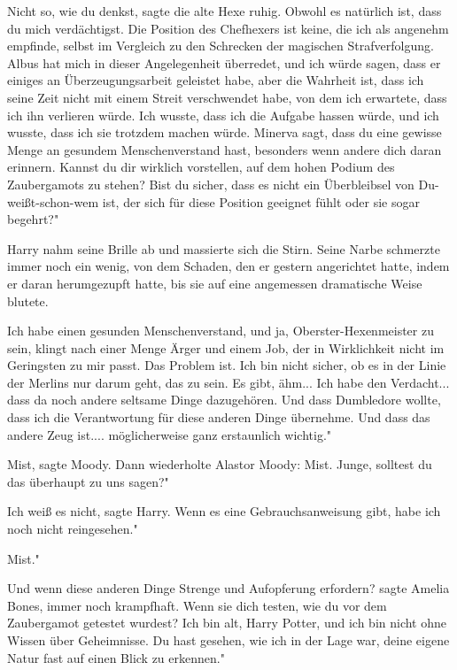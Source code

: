 \glqq Nicht so, wie du denkst\grqq{}, sagte die alte Hexe ruhig. \glqq Obwohl es
natürlich ist, dass du mich verdächtigst. Die Position des Chefhexers ist keine,
die ich als angenehm empfinde, selbst im Vergleich zu den Schrecken der
magischen Strafverfolgung. Albus hat mich in dieser Angelegenheit überredet, und
ich würde sagen, dass er einiges an Überzeugungsarbeit geleistet habe, aber die
Wahrheit ist, dass ich seine Zeit nicht mit einem Streit verschwendet habe, von
dem ich erwartete, dass ich ihn verlieren würde. Ich wusste, dass ich die
Aufgabe hassen würde, und ich wusste, dass ich sie trotzdem machen würde.
Minerva sagt, dass du eine gewisse Menge an gesundem Menschenverstand hast,
besonders wenn andere dich daran erinnern. Kannst du dir wirklich vorstellen,
auf dem hohen Podium des Zaubergamots zu stehen? Bist du sicher, dass es nicht
ein Überbleibsel von Du-weißt-schon-wem ist, der sich für diese Position
geeignet fühlt oder sie sogar begehrt?"

Harry nahm seine Brille ab und massierte sich die Stirn. Seine Narbe schmerzte
immer noch ein wenig, von dem Schaden, den er gestern angerichtet hatte, indem
er daran herumgezupft hatte, bis sie auf eine angemessen dramatische Weise
blutete.

\glqq Ich habe einen gesunden Menschenverstand, und ja, Oberster-Hexenmeister zu
sein, klingt nach einer Menge Ärger und einem Job, der in Wirklichkeit nicht im
Geringsten zu mir passt. Das Problem ist. Ich bin nicht sicher, ob es in der
Linie der Merlins nur darum geht, das zu sein. Es gibt, ähm... Ich habe den
Verdacht... dass da noch andere seltsame Dinge dazugehören. Und dass Dumbledore
wollte, dass ich die Verantwortung für diese anderen Dinge übernehme. Und dass
das andere Zeug ist.... möglicherweise ganz erstaunlich wichtig."

\glqq Mist\grqq{}, sagte Moody. Dann wiederholte Alastor Moody: \glqq Mist.
Junge, solltest du das überhaupt zu uns sagen?"

\glqq Ich weiß es nicht\grqq{}, sagte Harry. \glqq Wenn es eine
Gebrauchsanweisung gibt, habe ich noch nicht reingesehen."

\glqq Mist."

\glqq Und wenn diese anderen Dinge Strenge und Aufopferung erfordern?\grqq{}
sagte Amelia Bones, immer noch krampfhaft. \glqq Wenn sie dich testen, wie du
vor dem Zaubergamot getestet wurdest? Ich bin alt, Harry Potter, und ich bin
nicht ohne Wissen über Geheimnisse. Du hast gesehen, wie ich in der Lage war,
deine eigene Natur fast auf einen Blick zu erkennen."

